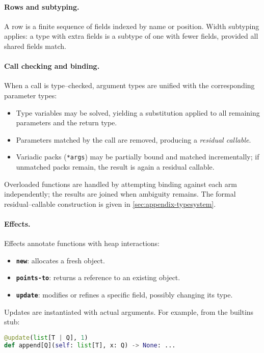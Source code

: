 \paragraph{Rows and subtyping.}
A row is a finite sequence of fields indexed by name or position.  
Width subtyping applies: a type with extra fields is a subtype of one with fewer fields, provided all shared fields match.

\paragraph{Call checking and binding.}
When a call is type--checked, argument types are unified with the corresponding parameter types:
\begin{itemize}
  \item Type variables may be solved, yielding a substitution applied to all remaining parameters and the return type.
  \item Parameters matched by the call are removed, producing a \emph{residual callable}.
  \item Variadic packs (\texttt{*args}) may be partially bound and matched incrementally; if unmatched packs remain, the result is again a residual callable.
\end{itemize}
Overloaded functions are handled by attempting binding against each arm independently; the results are joined when ambiguity remains.  
The formal residual--callable construction is given in \autoref{sec:appendix-typesystem}.

\paragraph{Effects.}
Effects annotate functions with heap interactions:
\begin{itemize}
  \item \textbf{\texttt{new}}: allocates a fresh object.
  \item \textbf{\texttt{points-to}}: returns a reference to an existing object.
  \item \textbf{\texttt{update}}: modifies or refines a specific field, possibly changing its type.
\end{itemize}
Updates are instantiated with actual arguments. For example, from the builtins stub:

\begin{lstlisting}[language=python]
@update(list[T | Q], 1)
def append[Q](self: list[T], x: Q) -> None: ...
\end{lstlisting}

